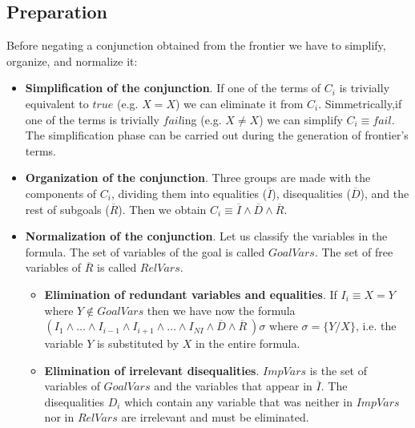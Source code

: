 \documentclass{llncs}
\begin{document}

\subsection{Preparation}
\label{preparation}


Before negating a conjunction obtained from the frontier we have to
simplify, organize, and normalize it:

\begin{itemize}

\item {\bf Simplification of the conjunction}. If one of the terms of
$C_i$ is trivially equivalent to 
$true$ (e.g. $X=X$) we can eliminate it from $C_i$. Simmetrically,if
one of the terms is trivially $fail$ing (e.g. $X \neq X$) we can simplify $C_i
\equiv fail$. The simplification phase can be carried out during the
generation of frontier's terms.

\item {\bf Organization of the conjunction}. Three groups are made with
the components of $C_i$, dividing them into equalities ($\overline{I}$), 
disequalities ($\overline{D}$), and the rest of subgoals ($\overline{R}$). 
Then we obtain $C_i \equiv \overline{I}
\wedge \overline{D} \wedge \overline{R}$.
  
\item {\bf Normalization of the conjunction}. Let us classify the
variables in the formula. The set of variables of the
goal is called $GoalVars$. The set of free variables of $\overline{R}$
is called $RelVars$.

    \begin{itemize}


       \item {\bf Elimination of redundant variables and
       equalities}. If $I_i \equiv X = Y$ where $Y \not\in GoalVars$
       then we have now the formula $ ( I_1 \wedge \ldots \wedge
       I_{i-1} \wedge I_{i+1} \wedge \ldots \wedge I_{NI} \wedge
       \overline{D} \wedge \overline{R}~) \sigma $ where $ \sigma = \{
       Y / X \}$, i.e. the variable $Y$ is substituted by $X$ in the
       entire formula. 
       \item {\bf Elimination of irrelevant disequalities}. $ImpVars$
       is the set of variables of $GoalVars$ and the variables that
       appear in $\overline{I}$. The disequalities $D_i$ which contain
       any variable that was neither in $ImpVars$ nor in $RelVars$ are
       irrelevant and must be eliminated.

    \end{itemize}

 \end{itemize}
\end{document}
